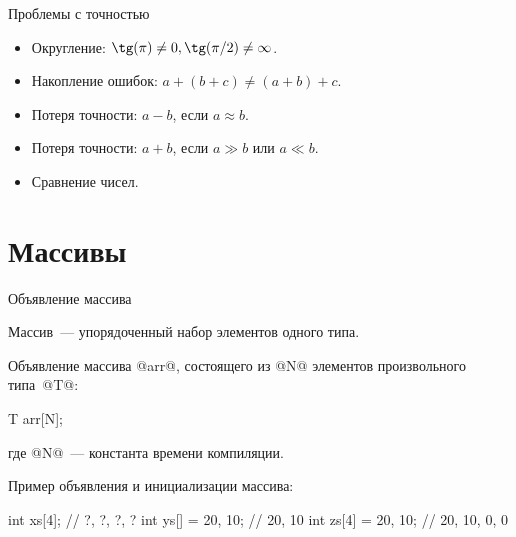 \begin{frame}{Проблемы с точностью}

  \begin{itemize}[<+->]
    \item Округление: $\tg(\pi) \neq 0, \tg(\pi/2) \neq \infty$.
    \item Накопление ошибок:
      $a + (b + c) \neq (a + b) + c$.
    \item Потеря точности:
      $a - b$, если $a \approx b$.
    \item Потеря точности:
      $a + b$, если $a \gg b$ или $a \ll b$.
    \item Сравнение чисел.
  \end{itemize}


\end{frame}


\section{Массивы}

\begin{frame}[fragile]{Объявление массива}


  Массив~--- упорядоченный набор элементов одного типа.

  \pause
  Объявление массива @arr@, состоящего из @N@ элементов произвольного
  типа~@T@:
  \begin{clisting}
    T arr[N];
  \end{clisting}
  \revertListingParskip
  где @N@~--- константа времени компиляции.

  \pause
  Пример объявления и инициализации массива:
  \begin{clisting}
    int xs[4];            // {?, ?, ?, ?}
    int ys[]  = {20, 10}; // {20, 10}
    int zs[4] = {20, 10}; // {20, 10, 0, 0}
  \end{clisting}

\end{frame}

